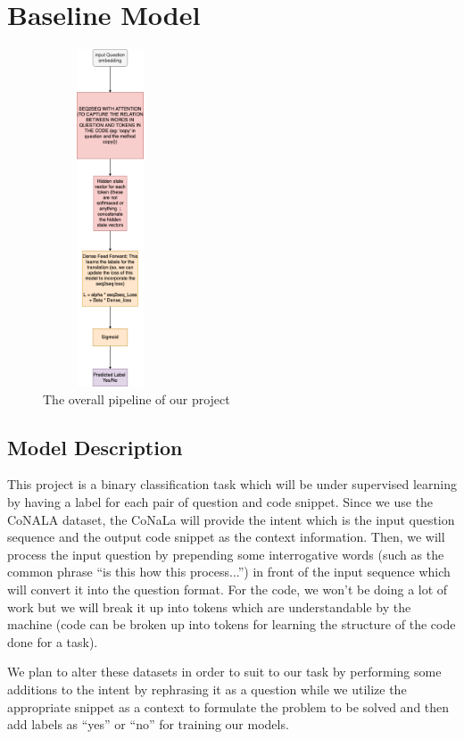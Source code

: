 \documentclass[11pt,a4paper]{article}
\begin{document}
\section{Baseline Model}
\begin{figure}
    \centering
    \includegraphics[height=10cm,width=4cm]{ModelPipeline.pdf}
    \caption{The overall pipeline of our project}
    \label{fig:my_label}
\end{figure}



\subsection{Model Description}
This project is a binary classification task which will be under supervised learning by having a label for each pair of question and code snippet. Since we use the CoNALA dataset, the CoNaLa will provide the intent
which is the input question sequence and the output code snippet as
the context information. Then, we will process the input question by
prepending some interrogative words (such as the common phrase “is
this how this process...”) in front of the input sequence which will
convert it into the question format. For the code, we won’t be doing a
lot of work but we will break it up into tokens which are
understandable by the machine (code can be broken up into tokens for
learning the structure of the code done for a task).

We plan to alter these datasets in order to suit to our task by
performing some additions to the intent by rephrasing it as a question
while we utilize the appropriate snippet as a context to formulate the
problem to be solved and then add labels as “yes” or “no” for training
our models.
\end{document}
